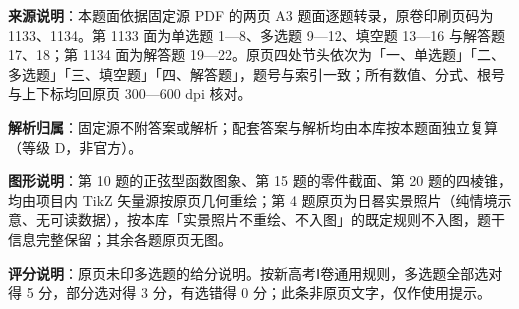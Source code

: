 

\begin{gknotice}
\textbf{来源说明}：本题面依据固定源 PDF 的两页 A3 题面逐题转录，原卷印刷页码为 1133、1134。第 1133 面为单选题 1—8、多选题 9—12、填空题 13—16 与解答题 17、18；第 1134 面为解答题 19—22。原页四处节头依次为「一、单选题」「二、多选题」「三、填空题」「四、解答题」，题号与索引一致；所有数值、分式、根号与上下标均回原页 300—600 dpi 核对。

\textbf{解析归属}：固定源不附答案或解析；配套答案与解析均由本库按本题面独立复算（等级 D，非官方）。

\textbf{图形说明}：第 10 题的正弦型函数图象、第 15 题的零件截面、第 20 题的四棱锥，均由项目内 TikZ 矢量源按原页几何重绘；第 4 题原页为日晷实景照片（纯情境示意、无可读数据），按本库「实景照片不重绘、不入图」的既定规则不入图，题干信息完整保留；其余各题原页无图。

\textbf{评分说明}：原页未印多选题的给分说明。按新高考Ⅰ卷通用规则，多选题全部选对得 5 分，部分选对得 3 分，有选错得 0 分；此条非原页文字，仅作使用提示。
\end{gknotice}


